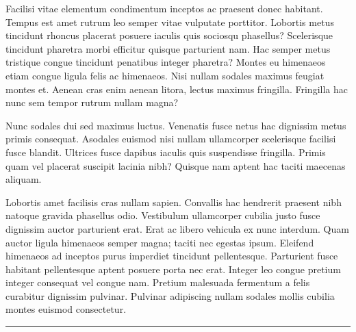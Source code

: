 \documentclass[12pt]{article}
\begin{document}
Facilisi vitae elementum condimentum inceptos ac praesent donec habitant. Tempus est amet rutrum leo semper vitae vulputate porttitor. Lobortis metus tincidunt rhoncus placerat posuere iaculis quis sociosqu phasellus? Scelerisque tincidunt pharetra morbi efficitur quisque parturient nam. Hac semper metus tristique congue tincidunt penatibus integer pharetra? Montes eu himenaeos etiam congue ligula felis ac himenaeos. Nisi nullam sodales maximus feugiat montes et. Aenean cras enim aenean litora, lectus maximus fringilla. Fringilla hac nunc sem tempor rutrum nullam magna?

Nunc sodales dui sed maximus luctus. Venenatis fusce netus hac dignissim metus primis consequat. Asodales euismod nisi nullam ullamcorper scelerisque facilisi fusce blandit. Ultrices fusce dapibus iaculis quis suspendisse fringilla. Primis quam vel placerat suscipit lacinia nibh? Quisque nam aptent hac taciti maecenas aliquam.

Lobortis amet facilisis cras nullam sapien. Convallis hac hendrerit praesent nibh natoque gravida phasellus odio. Vestibulum ullamcorper cubilia justo fusce dignissim auctor parturient erat. Erat ac libero vehicula ex nunc interdum. Quam auctor ligula himenaeos semper magna; taciti nec egestas ipsum. Eleifend himenaeos ad inceptos purus imperdiet tincidunt pellentesque. Parturient fusce habitant pellentesque aptent posuere porta nec erat. Integer leo congue pretium integer consequat vel congue nam. Pretium malesuada fermentum a felis curabitur dignissim pulvinar. Pulvinar adipiscing nullam sodales mollis cubilia montes euismod consectetur.
\vfill
\rule{\textwidth}{0.4pt}
\end{document}
